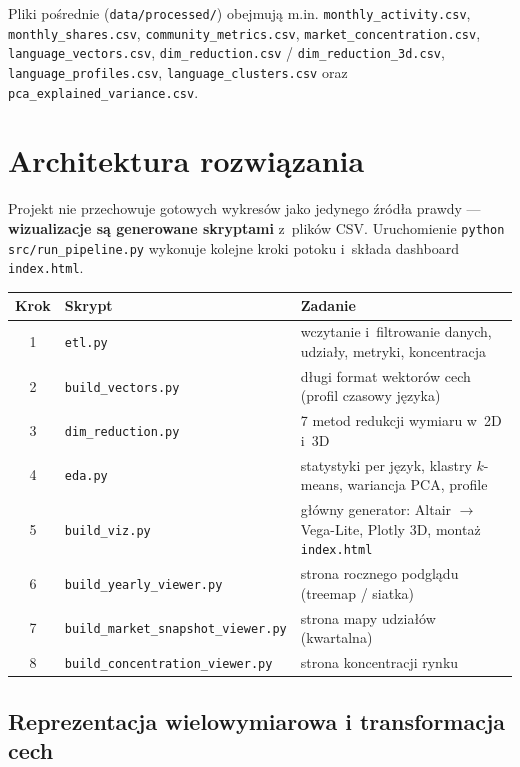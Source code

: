 \documentclass[11pt,a4paper]{article}
\begin{document}
Pliki pośrednie (\texttt{data/processed/}) obejmują m.in. \texttt{monthly\_activity.csv},
\texttt{monthly\_shares.csv}, \texttt{community\_metrics.csv},
\texttt{market\_concentration.csv}, \texttt{language\_vectors.csv},
\texttt{dim\_reduction.csv} / \texttt{dim\_reduction\_3d.csv},
\texttt{language\_profiles.csv}, \texttt{language\_clusters.csv} oraz
\texttt{pca\_explained\_variance.csv}.

\section{Architektura rozwiązania}

Projekt nie przechowuje gotowych wykresów jako jedynego źródła prawdy --- \textbf{wizualizacje
są generowane skryptami} z~plików CSV. Uruchomienie \texttt{python src/run\_pipeline.py}
wykonuje kolejne kroki potoku i~składa dashboard \texttt{index.html}.

\begin{center}
\begin{tabular}{@{}clp{9.5cm}@{}}
\toprule
\textbf{Krok} & \textbf{Skrypt} & \textbf{Zadanie} \\
\midrule
1 & \texttt{etl.py} & wczytanie i~filtrowanie danych, udziały, metryki, koncentracja \\
2 & \texttt{build\_vectors.py} & długi format wektorów cech (profil czasowy języka) \\
3 & \texttt{dim\_reduction.py} & 7 metod redukcji wymiaru w~2D i~3D \\
4 & \texttt{eda.py} & statystyki per język, klastry $k$-means, wariancja PCA, profile \\
5 & \texttt{build\_viz.py} & główny generator: Altair $\rightarrow$ Vega-Lite, Plotly 3D, montaż \texttt{index.html} \\
6 & \texttt{build\_yearly\_viewer.py} & strona rocznego podglądu (treemap / siatka) \\
7 & \texttt{build\_market\_snapshot\_viewer.py} & strona mapy udziałów (kwartalna) \\
8 & \texttt{build\_concentration\_viewer.py} & strona koncentracji rynku \\
\bottomrule
\end{tabular}
\end{center}

\subsection{Reprezentacja wielowymiarowa i transformacja cech}
\end{document}
